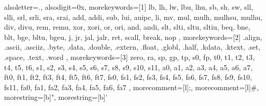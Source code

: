 \usepackage{listings}

\lstset{commentstyle=\itshape, stringstyle=\sffamily}
\lstset{escapechar=\%}

{
  alsoletter={.}, %
  alsodigit={0x}, %
  morekeywords=[1]{ %
    lb, lh, lw, lbu, lhu,
    sb, sh, sw,
    sll, slli, srl, srli, sra, srai,
    add, addi, sub, lui, auipc, li, mv,
    mul, mulh, mulhsu, mulhu, div, divu, rem, remu,
    xor, xori, or, ori, and, andi,
    slt, slti, sltu, sltiu,
    beq, bne, blt, bge, bltu, bgeu,
    j, jr, jal, jalr, ret,
    scall, break, nop
  },
  morekeywords=[2]{ %
    .align, .ascii, .asciiz, .byte, .data, .double, .extern,
    .float, .globl, .half, .kdata, .ktext, .set, .space, .text, .word
  },
  morekeywords=[3]{ %
    zero, ra, sp, gp, tp, s0, fp,
    t0, t1, t2, t3, t4, t5, t6,
    s1, s2, s3, s4, s5, s6, s7, s8, s9, s10, s11,
    a0, a1, a2, a3, a4, a5, a6, a7,
    ft0, ft1, ft2, ft3, ft4, ft5, ft6, ft7,
    fs0, fs1, fs2, fs3, fs4, fs5, fs6, fs7, fs8, fs9, fs10, fs11,
    fa0, fa1, fa2, fa3, fa4, fa5, fa6, fa7
  },
  morecomment=[l]{;},   %
  morecomment=[l]{\#},  %
  morestring=[b]",      %
  morestring=[b]'       %
}

